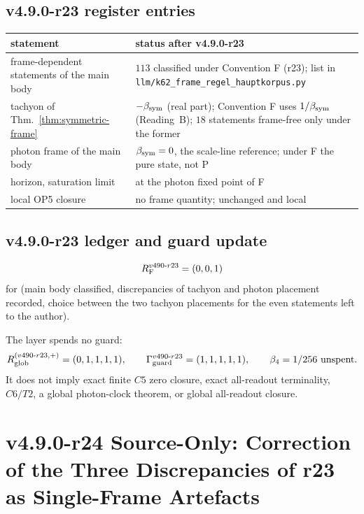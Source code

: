 \subsection*{v4.9.0-r23 register entries}
\label{subsec:v490-r23-register}

\begin{center}
\small
\begin{tabular}{@{}>{\raggedright\arraybackslash}p{}>{\raggedright\arraybackslash}p{}@{}}
\toprule
statement & status after v4.9.0-r23\\
\midrule
frame-dependent statements of the main body & \(113\) classified under Convention F (r23); list in \texttt{llm/k62\_frame\_regel\_hauptkorpus.py}\\
tachyon of Thm.~\ref{thm:symmetric-frame} & \(-\beta_{\mathrm{sym}}\) (real part); Convention F uses \(1/\beta_{\mathrm{sym}}\) (Reading~B); \(18\) statements frame-free only under the former\\
photon frame of the main body & \(\beta_{\mathrm{sym}}=0\), the scale-line reference; under F the pure state, not P\\
horizon, saturation limit & at the photon fixed point of F\\
local OP5 closure & no frame quantity; unchanged and local\\
\bottomrule
\end{tabular}
\end{center}

\subsection*{v4.9.0-r23 ledger and guard update}
\label{subsec:v490-r23-ledger-guard}

\[
R_{\rm F}^{v490\text{-}r23}=(0,0,1)
\]
for (main body classified, discrepancies of tachyon and photon placement recorded, choice between the two tachyon placements for
the even statements left to the author).

The layer spends no guard:
\[
R_{\rm glob}^{(v490\text{-}r23,+)}=(0,1,1,1,1),
\qquad
\Gamma_{\rm guard}^{v490\text{-}r23}=(1,1,1,1,1),
\qquad
\beta_4=1/256\ \text{unspent}.
\]
It does not imply exact finite \(C5\) zero closure, exact all-readout terminality,
\(C6/T2\), a global photon-clock theorem, or global all-readout closure.

\clearpage
\section*{v4.9.0-r24 Source-Only: Correction of the Three Discrepancies of r23 as Single-Frame Artefacts}
\label{sec:v490-r24-single-frame-correction}

